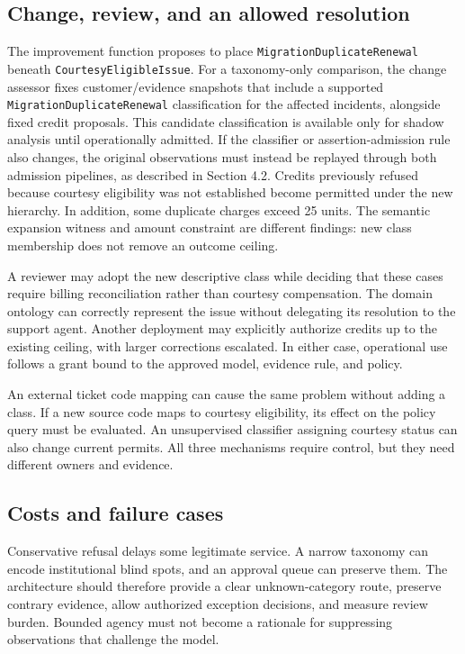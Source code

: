 \documentclass[
  english,
  12pt,
  a4paper,
  preprint,
  numbers,
  nopreprintline]{elsarticle}
\begin{document}
\subsection{Change, review, and an allowed
resolution}\label{change-review-and-an-allowed-resolution}

The improvement function proposes to place
\texttt{Migration\allowbreak{}Duplicate\allowbreak{}Renewal} beneath
\texttt{Courtesy\allowbreak{}Eligible\allowbreak{}Issue}. For a taxonomy-only comparison, the
change assessor fixes customer/evidence snapshots that include a
supported \texttt{Migration\allowbreak{}Duplicate\allowbreak{}Renewal} classification for the
affected incidents, alongside fixed credit proposals. This candidate
classification is available only for shadow analysis until operationally
admitted. If the classifier or assertion-admission rule also changes,
the original observations must instead be replayed through both
admission pipelines, as described in Section 4.2. Credits previously
refused because courtesy eligibility was not established become
permitted under the new hierarchy. In addition, some duplicate charges
exceed 25 units. The semantic expansion witness and amount constraint
are different findings: new class membership does not remove an outcome
ceiling.

A reviewer may adopt the new descriptive class while deciding that these
cases require billing reconciliation rather than courtesy compensation.
The domain ontology can correctly represent the issue without delegating
its resolution to the support agent. Another deployment may explicitly
authorize credits up to the existing ceiling, with larger corrections
escalated. In either case, operational use follows a grant bound to the
approved model, evidence rule, and policy.

An external ticket code mapping can cause the same problem without
adding a class. If a new source code maps to courtesy eligibility, its
effect on the policy query must be evaluated. An unsupervised classifier
assigning courtesy status can also change current permits. All three
mechanisms require control, but they need different owners and evidence.

\subsection{Costs and failure cases}\label{costs-and-failure-cases}

Conservative refusal delays some legitimate service. A narrow taxonomy
can encode institutional blind spots, and an approval queue can preserve
them. The architecture should therefore provide a clear unknown-category
route, preserve contrary evidence, allow authorized exception decisions,
and measure review burden. Bounded agency must not become a rationale
for suppressing observations that challenge the model.
\end{document}
